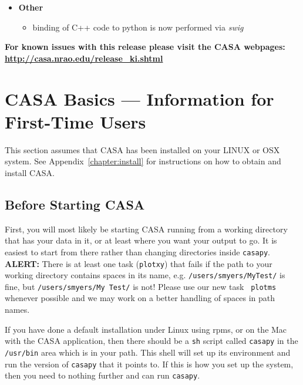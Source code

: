 \begin{itemize}
\begin{itemize}
\begin{itemize}
     \end{itemize}

\end{itemize}

\item {\bf Other}

\begin{itemize}
  \item  binding of C++ code to python is now performed via {\it swig} 
 

\end{itemize}
\end{itemize}




{\bf For known issues with this release please visit the CASA webpages:\\ \url{http://casa.nrao.edu/release_ki.shtml}}


\section{CASA Basics --- Information for First-Time Users}
\label{section:intro.basics}

This section assumes that CASA has been installed on your LINUX or OSX
system.  See Appendix~\ref{chapter:install} for instructions on how to 
obtain and install CASA.  

\subsection{Before Starting CASA}
\label{section:intro.basics.before}

First, you will most likely be starting CASA running from a working
directory that has your data in it, or at least where you want your
output to go.  It is easiest to start from there rather than changing
directories inside {\tt casapy}.
{\bf ALERT:} There is at least one task ({\tt plotxy}) that 
fails if the path to your working directory contains spaces in
its name, e.g. {\tt /users/smyers/MyTest/} is fine, but 
{\tt /users/smyers/My\ Test/} is not!  Please use our new task {\tt
  plotms} whenever possible and we may work on a better handling of
spaces in path names. 

If you have done a default installation under Linux using rpms, or 
on the Mac with the CASA application, then there should be a {\tt sh}
script called {\tt casapy} in the {\tt /usr/bin} area which is in
your path.  This shell will set up its environment and run the version
of {\tt casapy} that it points to.  If this is how you set up the
system, then you need to nothing further and can run {\tt casapy}.


